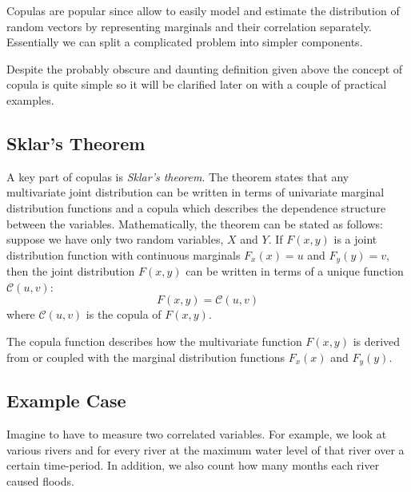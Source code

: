 Copulas are popular since allow to easily model and estimate the distribution of random vectors by representing marginals and their correlation separately.
Essentially we can split a complicated problem into simpler components.

Despite the probably obscure and daunting definition given above the concept of copula is quite simple so it will be clarified later on with a couple of practical examples.

\subsection{Sklar's Theorem}

A key part of copulas is \emph{Sklar’s theorem}. The theorem states that any multivariate joint distribution can be written in terms of univariate marginal distribution functions and a copula which describes the dependence structure between the variables. Mathematically, the theorem can be stated as follows: suppose we have only two random variables, $X$ and $Y$. If $F(x,y)$ is a joint distribution function with continuous marginals 
$F_x(x)=u$ and $F_y(y)=v$, then the joint distribution $F(x,y)$ can be written in terms of a unique function $\mathcal{C}(u,v)$:
\begin{equation}
F(x,y)=\mathcal{C}(u,v)
\end{equation}
\noindent
where $\mathcal{C}(u,v)$ is the copula of $F(x,y)$.

The copula function describes how the multivariate function $F(x,y)$ is derived from or coupled with the marginal distribution functions $F_x(x)$ and $F_y(y)$.


\subsection{Example Case}
\label{example-problem-case}

Imagine to have to measure two correlated variables. For example, we look at various rivers and for every river at the maximum water level of that river over a certain time-period. In addition, we also count how many months each river caused floods.

